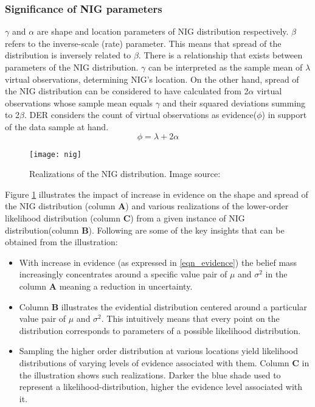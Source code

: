 	\subsubsection{Significance of NIG parameters}\label{sec_nig_param}
	$\gamma$  and $\alpha$ are shape and location parameters of NIG distribution respectively. $\beta$ refers to the inverse-scale (rate) parameter. This means that spread of the distribution is inversely related to $\beta$. There is a relationship that exists between parameters of the NIG distribution. $\gamma$ can be interpreted as the sample mean of $\lambda$ virtual observations, determining NIG's location. On the other hand, spread of the NIG distribution  can be considered to have calculated from 2$\alpha$ virtual observations whose sample mean equals $\gamma$ and their squared deviations summing to 2$\beta$. DER considers the count of virtual observations as evidence($\phi$) in support of the data sample at hand.   
	\begin{equation}\label{eqn_evidence}
		\phi = \lambda + 2\alpha
	\end{equation}
	\begin{figure}[h]
		\centering
		\texttt{[image: nig]}
		\caption{Realizations of the NIG distribution.  Image source: }
		\label{fig_nig_realization}
	\end{figure}
	Figure \ref{fig_nig_realization} illustrates the impact of increase in evidence on the shape and spread of the NIG distribution (column \textbf{A}) and various realizations of the lower-order likelihood distribution (column \textbf{C}) from a given instance of NIG distribution(column \textbf{B}). Following are some of the key insights that can be obtained from the illustration:
	\begin{itemize}
		\item With increase in evidence (as expressed in \ref{eqn_evidence}) the belief mass increasingly concentrates around a specific value pair of $\mu$ and $\sigma^2$ in the column \textbf{A} meaning a reduction in uncertainty.
		\item Column \textbf{B} illustrates the evidential distribution  centered around a particular value pair of $\mu$ and $\sigma^2$. This intuitively means that every point on the distribution corresponds to parameters of a possible likelihood distribution. 
		\item  Sampling the higher order distribution at various locations yield likelihood distributions of varying levels of evidence associated with them. Column \textbf{C} in the illustration shows such realizations. Darker the blue shade used to represent a likelihood-distribution, higher the evidence level associated with it.  
	\end{itemize}
